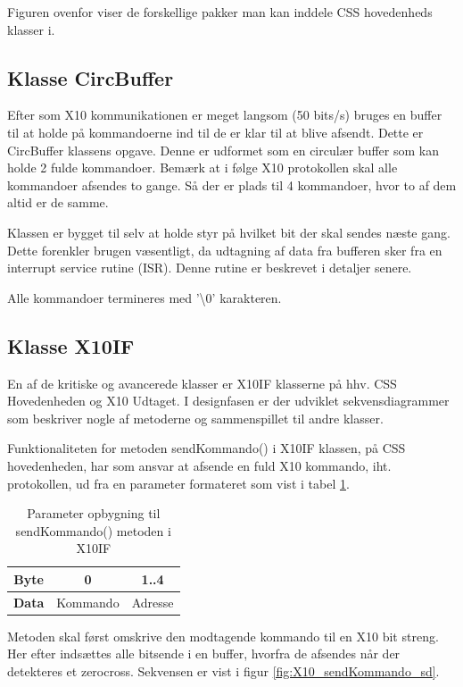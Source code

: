 Figuren ovenfor viser de forskellige pakker man kan inddele CSS hovedenheds klasser i.

\subsection{Klasse CircBuffer}
Efter som X10 kommunikationen er meget langsom (50 bits/s) bruges en buffer til at holde på kommandoerne ind til de er klar til at blive afsendt. Dette er CircBuffer klassens opgave.
Denne er udformet som en circulær buffer som kan holde 2 fulde kommandoer. Bemærk at i følge X10 protokollen skal alle kommandoer afsendes to gange. Så der er plads til 4 kommandoer, hvor to af dem altid er de samme.

Klassen er bygget til selv at holde styr på hvilket bit der skal sendes næste gang. Dette forenkler brugen væsentligt, da udtagning af data fra bufferen sker fra en interrupt service rutine (ISR). Denne rutine er beskrevet i detaljer senere.

Alle kommandoer termineres med '\textbackslash 0' karakteren. 

\subsection{Klasse X10IF}
En af de kritiske og avancerede klasser er X10IF klasserne på hhv. CSS Hovedenheden og X10 Udtaget. I designfasen er der udviklet sekvensdiagrammer som beskriver nogle af metoderne og sammenspillet til andre klasser.

Funktionaliteten for metoden sendKommando() i X10IF klassen, på CSS hovedenheden, har som ansvar at afsende en fuld X10 kommando, iht. protokollen, ud fra en parameter formateret som vist i tabel \ref{table:X10_sendKommando_format}.

\begin{table}[h]
	\caption{Parameter opbygning til sendKommando() metoden i X10IF}
	\centering
	\begin{tabular}{|c|c|c|}
		\hline 
		\textbf{Byte} & 0 & 1..4 \\ \hline
		\textbf{Data} & Kommando & Adresse \\ 
		\hline 
	\end{tabular} 
	\label{table:X10_sendKommando_format}
\end{table}

Metoden skal først omskrive den modtagende kommando til en X10 bit streng. Her efter indsættes alle bitsende i en buffer, hvorfra de afsendes når der detekteres et zerocross. 
Sekvensen er vist i figur \ref{fig:X10_sendKommando_sd}.


